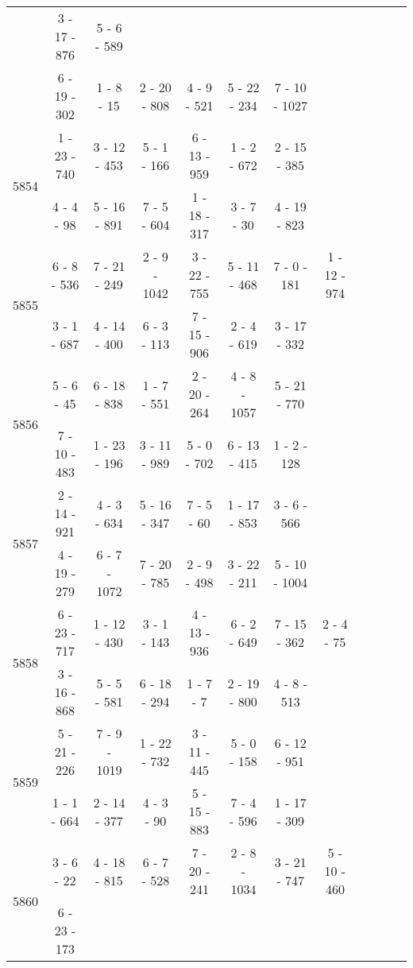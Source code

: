 \begin{longtable}{c | c | c | c | c | c | c | c | c | c | c | c}
&
3 - 17 - 876
&
5 - 6 - 589
&\space\\* \space
&
6 - 19 - 302
&
1 - 8 - 15
&
2 - 20 - 808
&
4 - 9 - 521
&
5 - 22 - 234
&
7 - 10 - 1027
&\space\\\hline
\multirow{2}{*}{5854}
& 1 - 23 - 740
&
3 - 12 - 453
&
5 - 1 - 166
&
6 - 13 - 959
&
1 - 2 - 672
&
2 - 15 - 385
&\space\\* \space
&
4 - 4 - 98
&
5 - 16 - 891
&
7 - 5 - 604
&
1 - 18 - 317
&
3 - 7 - 30
&
4 - 19 - 823
&\space\\\hline
\multirow{2}{*}{5855}
& 6 - 8 - 536
&
7 - 21 - 249
&
2 - 9 - 1042
&
3 - 22 - 755
&
5 - 11 - 468
&
7 - 0 - 181
&
1 - 12 - 974
\\* \space
&
3 - 1 - 687
&
4 - 14 - 400
&
6 - 3 - 113
&
7 - 15 - 906
&
2 - 4 - 619
&
3 - 17 - 332
&\space\\\hline
\multirow{2}{*}{5856}
& 5 - 6 - 45
&
6 - 18 - 838
&
1 - 7 - 551
&
2 - 20 - 264
&
4 - 8 - 1057
&
5 - 21 - 770
&\space\\* \space
&
7 - 10 - 483
&
1 - 23 - 196
&
3 - 11 - 989
&
5 - 0 - 702
&
6 - 13 - 415
&
1 - 2 - 128
&\space\\\hline
\multirow{2}{*}{5857}
& 2 - 14 - 921
&
4 - 3 - 634
&
5 - 16 - 347
&
7 - 5 - 60
&
1 - 17 - 853
&
3 - 6 - 566
&\space\\* \space
&
4 - 19 - 279
&
6 - 7 - 1072
&
7 - 20 - 785
&
2 - 9 - 498
&
3 - 22 - 211
&
5 - 10 - 1004
&\space\\\hline
\multirow{2}{*}{5858}
& 6 - 23 - 717
&
1 - 12 - 430
&
3 - 1 - 143
&
4 - 13 - 936
&
6 - 2 - 649
&
7 - 15 - 362
&
2 - 4 - 75
\\* \space
&
3 - 16 - 868
&
5 - 5 - 581
&
6 - 18 - 294
&
1 - 7 - 7
&
2 - 19 - 800
&
4 - 8 - 513
&\space\\\hline
\multirow{2}{*}{5859}
& 5 - 21 - 226
&
7 - 9 - 1019
&
1 - 22 - 732
&
3 - 11 - 445
&
5 - 0 - 158
&
6 - 12 - 951
&\space\\* \space
&
1 - 1 - 664
&
2 - 14 - 377
&
4 - 3 - 90
&
5 - 15 - 883
&
7 - 4 - 596
&
1 - 17 - 309
&\space\\\hline
\multirow{2}{*}{5860}
& 3 - 6 - 22
&
4 - 18 - 815
&
6 - 7 - 528
&
7 - 20 - 241
&
2 - 8 - 1034
&
3 - 21 - 747
&
5 - 10 - 460
\\* \space
&
6 - 23 - 173
&


\end{longtable}

